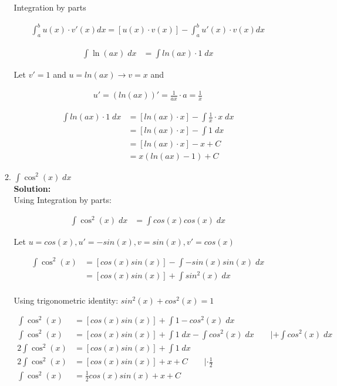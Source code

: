 \documentclass[a4paper]{article}
\begin{document}
\begin{enumerate}
\begin{enumerate}
Integration by parts

\begin{align*}
	\int_a^b u(x) \cdot v'(x)dx = \left[ u(x) \cdot v(x) \right] - \int_a^b u'(x) \cdot v(x)dx
\end{align*}

	
\begin{align*}
	\int \ln(ax) \; dx &= \int ln(ax) \cdot 1 \; dx
\end{align*}

Let $v' = 1$ and $u = ln(ax) \rightarrow v = x$ and

\begin{align*}
	u' = (ln(ax))' = \frac{1}{ax} \cdot a = \frac{1}{x}
\end{align*}

\begin{align*}
	\int ln(ax) \cdot 1 \; dx &= \left[ ln(ax) \cdot x\right] - \int \frac{1}{x} \cdot x \; dx\\
	&= \left[ ln(ax) \cdot x\right] - \int 1 \; dx\\
	&= \left[ ln(ax) \cdot x\right] - x + C\\
	&= x(ln(ax) - 1) + C
\end{align*}
	
	\item $\int \cos^2(x) \; dx$\\
	\textbf{Solution:}\\

Using Integration by parts:

\begin{align*}
	\int \cos^2(x) \; dx &= \int cos(x)cos(x) \; dx
\end{align*}

Let $u = cos(x), u' = -sin(x), v = sin(x), v' = cos(x)$

\begin{align*}
	\int \cos^2(x) &= \left[ cos(x)sin(x) \right] - \int -sin(x) sin(x) \; dx\\
	&= \left[ cos(x)sin(x) \right] + \int sin^2(x) \; dx\\
\end{align*}

Using trigonometric identity: $sin^2(x) + cos^2(x) = 1$

\begin{align*}
\int \cos^2(x) &= \left[ cos(x)sin(x) \right] + \int 1 - cos^2(x) \; dx\\
\int \cos^2(x) &=  \left[ cos(x)sin(x) \right] + \int 1 \; dx - \int cos^2(x) \; dx \qquad | + \int cos^2(x) \; dx\\
2\int \cos^2(x) &=  \left[ cos(x)sin(x) \right] + \int 1 \; dx\\
2\int \cos^2(x) &=  \left[ cos(x)sin(x) \right] + x + C \qquad | \cdot \frac{1}{2}\\
\int \cos^2(x) &= \frac{1}{2} cos(x)sin(x)+x + C
\end{align*}


\end{enumerate}
\end{enumerate}
\end{document}
